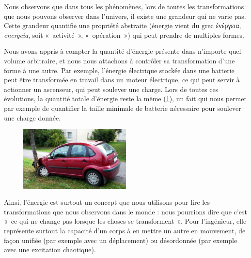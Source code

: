 		Nous observons que dans tous les phénomènes, lors de toutes les transformations que nous pouvons observer dans l’univers, il existe une grandeur qui ne varie pas. Cette grandeur quantifie une propriété abstraite (énergie vient du grec \textgreek{ἐνέργεια}, \textit{energeia}, soit «~activité~», «~opération~») qui peut prendre de multiples formes. %
		
		Nous avons appris à compter la quantité d’énergie présente dans n’importe quel volume arbitraire, et nous nous attachons à contrôler sa transformation d’une forme à une autre. Par exemple, l’énergie électrique stockée dans une batterie peut être transformée en travail dans un moteur électrique, ce qui peut servir à actionner un ascenseur, qui peut soulever une charge. Lors de toutes ces évolutions, la quantité totale d’énergie reste la même (\cref{fig_crashed_car}), un fait qui nous permet par exemple de quantifier la taille minimale de batterie nécessaire pour soulever une charge donnée.
		
		\begin{figure}
			\begin{center}
				\includegraphics[width=0.5\textwidth]{images/crashed_citroen_c3.jpg}
			\end{center}
			\label{fig_crashed_car}
		\end{figure}
		
		Ainsi, l’énergie est surtout un concept que nous utilisons pour lire les transformations que nous observons dans le monde : nous pourrions dire que c’est «~ce qui ne change pas lorsque les choses se transforment~». Pour l’ingénieur, elle représente surtout la capacité d’un corps à en mettre un autre en mouvement, de façon unifiée (par exemple avec un déplacement) ou désordonnée (par exemple avec une excitation chaotique). 

